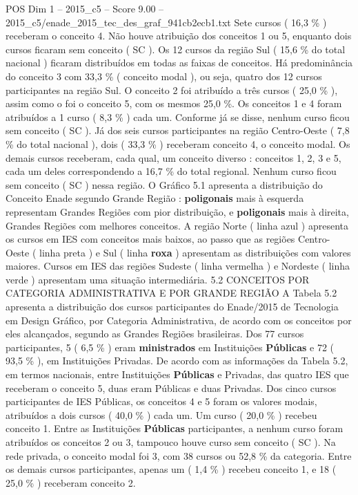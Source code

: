 \begin{textsample}{POS Dim 1 – 2015\_c5 – Score 9.00 – 2015\_c5/enade\_2015\_tec\_des\_graf\_941cb2ecb1.txt}
Sete cursos ( 16,3 \% ) receberam o conceito 4.
Não houve atribuição dos conceitos 1 ou 5, enquanto dois cursos ficaram sem conceito ( SC ).
Os 12 cursos da região Sul ( 15,6 \% do total nacional ) ficaram distribuídos em todas as faixas de conceitos.
Há predominância do conceito 3 com 33,3 \% ( conceito modal ), ou seja, quatro dos 12 cursos participantes na região Sul.
O conceito 2 foi atribuído a três cursos ( 25,0 \% ), assim como o foi o conceito 5, com os mesmos 25,0 \%.
Os conceitos 1 e 4 foram atribuídos a 1 curso ( 8,3 \% ) cada um.
Conforme já se disse, nenhum curso ficou sem conceito ( SC ).
Já dos seis cursos participantes na região Centro-Oeste ( 7,8 \% do total nacional ), dois ( 33,3 \% ) receberam conceito 4, o conceito modal.
Os demais cursos receberam, cada qual, um conceito diverso : conceitos 1, 2, 3 e 5, cada um deles correspondendo a 16,7 \% do total regional.
Nenhum curso ficou sem conceito ( SC ) nessa região.
O Gráfico 5.1 apresenta a distribuição do Conceito Enade segundo Grande Região : \textbf{poligonais} mais à esquerda representam Grandes Regiões com pior distribuição, e \textbf{poligonais} mais à direita, Grandes Regiões com melhores conceitos.
A região Norte ( linha azul ) apresenta os cursos em IES com conceitos mais baixos, ao passo que as regiões Centro-Oeste ( linha preta ) e Sul ( linha \textbf{roxa} ) apresentam as distribuições com valores maiores.
Cursos em IES das regiões Sudeste ( linha vermelha ) e Nordeste ( linha verde ) apresentam uma situação intermediária. 5.2 CONCEITOS POR CATEGORIA ADMINISTRATIVA E POR GRANDE REGIÃO A Tabela 5.2 apresenta a distribuição dos cursos participantes do Enade/2015 de Tecnologia em Design Gráfico, por Categoria Administrativa, de acordo com os conceitos por eles alcançados, segundo as Grandes Regiões brasileiras.
Dos 77 cursos participantes, 5 ( 6,5 \% ) eram \textbf{ministrados} em Instituições \textbf{Públicas} e 72 ( 93,5 \% ), em Instituições Privadas.
De acordo com as informações da Tabela 5.2, em termos nacionais, entre Instituições \textbf{Públicas} e Privadas, das quatro IES que receberam o conceito 5, duas eram Públicas e duas Privadas.
Dos cinco cursos participantes de IES Públicas, os conceitos 4 e 5 foram os valores modais, atribuídos a dois cursos ( 40,0 \% ) cada um.
Um curso ( 20,0 \% ) recebeu conceito 1.
Entre as Instituições \textbf{Públicas} participantes, a nenhum curso foram atribuídos os conceitos 2 ou 3, tampouco houve curso sem conceito ( SC ).
Na rede privada, o conceito modal foi 3, com 38 cursos ou 52,8 \% da categoria.
Entre os demais cursos participantes, apenas um ( 1,4 \% ) recebeu conceito 1, e 18 ( 25,0 \% ) receberam conceito 2.

\end{textsample}
